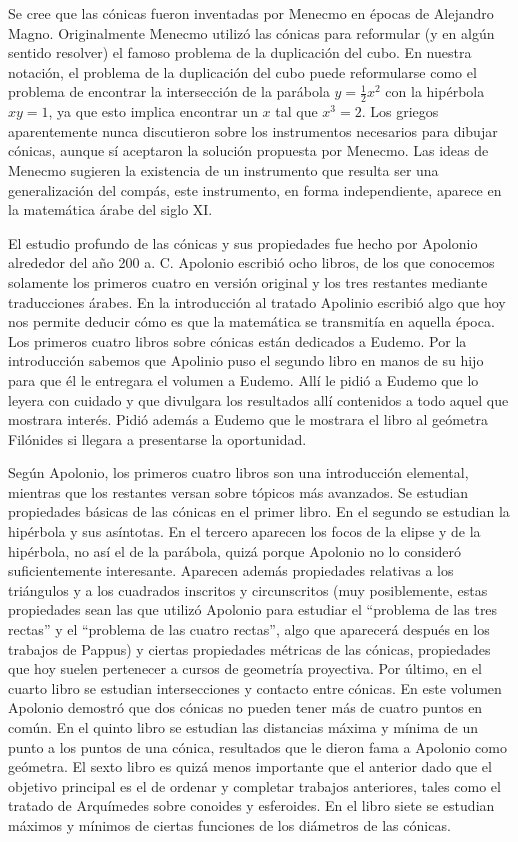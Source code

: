 Se cree que las cónicas fueron inventadas por Menecmo en épocas de Alejandro
Magno. Originalmente Menecmo utilizó las cónicas para reformular (y en algún
sentido resolver) el famoso problema de la duplicación del cubo. En nuestra
notación, el problema de la duplicación del cubo puede reformularse como el
problema de encontrar la intersección de la parábola $y=\frac12x^2$ con la
hipérbola $xy=1$, ya que esto implica encontrar un $x$ tal que $x^3=2$. Los
griegos aparentemente nunca discutieron sobre los instrumentos necesarios
para dibujar cónicas, aunque sí aceptaron la solución propuesta por Menecmo.
Las ideas de Menecmo sugieren la existencia de un instrumento que resulta ser
una generalización del compás, este instrumento, en forma independiente,
aparece en la matemática árabe del siglo XI. 

El estudio profundo de las cónicas y sus propiedades fue hecho por Apolonio
alrededor del año 200 a. C.  Apolonio escribió ocho libros, de los que
conocemos solamente los primeros cuatro en versión original y los tres
restantes mediante traducciones árabes. En la introducción al tratado Apolinio escribió
algo que hoy nos permite deducir cómo es que la matemática se transmitía en aquella
época. Los primeros cuatro libros sobre cónicas están dedicados a Eudemo.  Por
la introducción sabemos que Apolinio puso el segundo libro en manos de su hijo
para que él le entregara el volumen a Eudemo. Allí le pidió a Eudemo 
que lo leyera con cuidado
y que divulgara los resultados allí contenidos a todo aquel que mostrara interés.
Pidió además a Eudemo que le mostrara el libro al geómetra Filónides si llegara a
presentarse la oportunidad. 

Según Apolonio, los primeros cuatro libros son una introducción elemental, mientras que 
los restantes versan sobre tópicos más avanzados.  Se estudian propiedades
básicas de las cónicas en el primer libro. En el segundo se estudian la
hipérbola y sus asíntotas. En el tercero aparecen los focos de la elipse y de
la hipérbola, no así el de la parábola, quizá porque Apolonio no lo consideró
suficientemente interesante. Aparecen además propiedades relativas a los
triángulos y a los cuadrados inscritos y circunscritos (muy posiblemente, estas
propiedades sean las que utilizó Apolonio para estudiar el ``problema de las
tres rectas'' y el ``problema de las cuatro rectas'', algo que aparecerá
después en los trabajos de Pappus) y ciertas propiedades métricas
de las cónicas, propiedades que hoy suelen pertenecer a cursos de geometría
proyectiva. Por último, en el cuarto libro se estudian intersecciones y contacto
entre cónicas. En este volumen Apolonio demostró que dos cónicas no pueden
tener más de cuatro puntos en común. En el quinto libro se estudian las
distancias máxima y mínima de un punto a los puntos de una cónica, resultados
que le dieron fama a Apolonio como geómetra. El sexto libro es quizá menos
importante que el anterior dado que el objetivo principal es el de ordenar y
completar trabajos anteriores, tales como el tratado de Arquímedes sobre
conoides y esferoides. En el libro siete se estudian máximos y mínimos de
ciertas funciones de los diámetros de las cónicas. 

